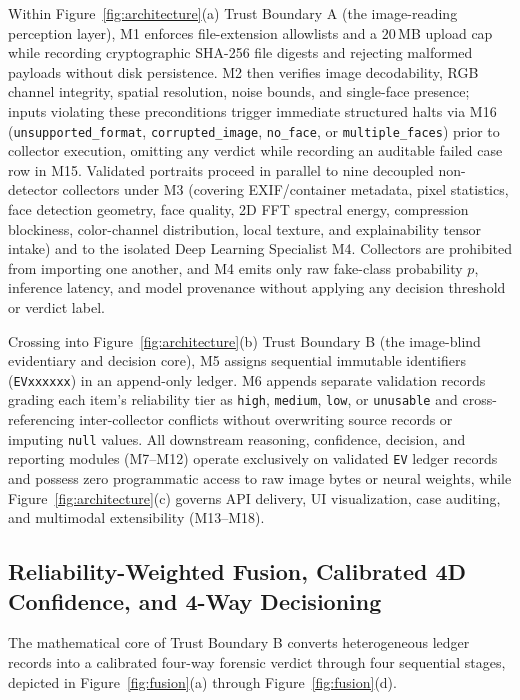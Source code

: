 \documentclass[final,5p,times,twocolumn,numafflabel]{elsarticle}
\begin{document}
Within Figure~\ref{fig:architecture}(a) Trust Boundary A (the image-reading perception layer), M1 enforces file-extension allowlists and a $20$\,MB upload cap while recording cryptographic SHA-256 file digests and rejecting malformed payloads without disk persistence. M2 then verifies image decodability, RGB channel integrity, spatial resolution, noise bounds, and single-face presence; inputs violating these preconditions trigger immediate structured halts via M16 (\texttt{unsupported\_format}, \texttt{corrupted\_image}, \texttt{no\_face}, or \texttt{multiple\_faces}) prior to collector execution, omitting any verdict while recording an auditable failed case row in M15. Validated portraits proceed in parallel to nine decoupled non-detector collectors under M3 (covering EXIF/container metadata, pixel statistics, face detection geometry, face quality, 2D FFT spectral energy, compression blockiness, color-channel distribution, local texture, and explainability tensor intake) and to the isolated Deep Learning Specialist M4. Collectors are prohibited from importing one another, and M4 emits only raw fake-class probability $p$, inference latency, and model provenance without applying any decision threshold or verdict label.

Crossing into Figure~\ref{fig:architecture}(b) Trust Boundary B (the image-blind evidentiary and decision core), M5 assigns sequential immutable identifiers (\texttt{EVxxxxxx}) in an append-only ledger. M6 appends separate validation records grading each item's reliability tier as \texttt{high}, \texttt{medium}, \texttt{low}, or \texttt{unusable} and cross-referencing inter-collector conflicts without overwriting source records or imputing \texttt{null} values. All downstream reasoning, confidence, decision, and reporting modules (M7--M12) operate exclusively on validated \texttt{EV} ledger records and possess zero programmatic access to raw image bytes or neural weights, while Figure~\ref{fig:architecture}(c) governs API delivery, UI visualization, case auditing, and multimodal extensibility (M13--M18).

\subsection{Reliability-Weighted Fusion, Calibrated 4D Confidence, and 4-Way Decisioning}
\label{subsec:fusion}

The mathematical core of Trust Boundary B converts heterogeneous ledger records into a calibrated four-way forensic verdict through four sequential stages, depicted in Figure~\ref{fig:fusion}(a) through Figure~\ref{fig:fusion}(d).
\end{document}
